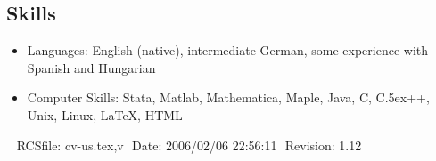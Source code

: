 \documentclass[overlapped,line,draft,11pt,letterpaper]{res}
\def\Cplusplus{{\rm C\raise.5ex\hbox{\small ++}}}
\begin{document}
\begin{resume}

\section{\bf Skills}
\begin{itemize}
\item Languages: English (native), intermediate German,
  some experience with Spanish and Hungarian
\item Computer Skills: Stata, Matlab, Mathematica, Maple, Java, C,
  \Cplusplus, Unix, Linux, \LaTeX, HTML
\end{itemize}


\begin{center}
\vspace{\fill}\ \newline
{\tiny \rm $ $RCSfile: cv-us.tex,v $ $ }
{\tiny \rm $ $Date: 2006/02/06 22:56:11 $ $ }
{\tiny \rm $ $Revision: 1.12 $ $ }
\end{center}

\end{resume}
\end{document}
